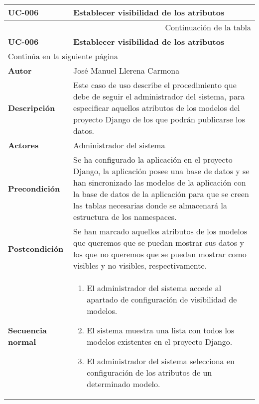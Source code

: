 \begin{center}
\begin{longtable}{||p{3.4cm}|p{12cm}||}
 \hline \hline \bf UC-006 &  \bf Establecer visibilidad de los atributos\\
\hline
\endfirsthead
\hline \multicolumn{2}{|r|}{{Continuación de la tabla}} \\ \hline
 \hline \bf UC-006 &  \bf Establecer visibilidad de los atributos \\
\hline
\endhead
\hline \multicolumn{2}{|l|}{{Continúa en la siguiente página}} \\ \hline
\endfoot
\endlastfoot
 \hline \bf Autor & José Manuel Llerena Carmona \\
 \hline \bf Descripción & Este caso de uso describe el procedimiento que debe
             de seguir el administrador del sistema, para especificar aquellos
             atributos de los modelos del proyecto Django de los que podrán
             publicarse los datos.\\
 \hline \bf Actores & Administrador del sistema\\
 \hline \bf Precondición & Se ha configurado la aplicación en el proyecto
             Django, la aplicación posee una base de datos y se han sincronizado
             las modelos de la aplicación con la base de datos de la aplicación
             para que se creen las tablas necesarias donde se almacenará la
             estructura de los namespaces.\\
 \hline \bf Postcondición & Se han marcado aquellos atributos de los modelos
             que queremos que se puedan mostrar sus datos y los que no queremos
             que se puedan mostrar como visibles y no visibles, respectivamente.\\
 \hline \bf Secuencia normal & 
             \begin{enumerate}
                \item El administrador del sistema accede al apartado de
                       configuración de visibilidad de modelos.
                \item El sistema muestra una lista con todos los modelos
                       existentes en el proyecto Django.
                \item El administrador del sistema selecciona en configuración
                       de los atributos de un determinado modelo.

\end{enumerate}
\end{longtable}
\end{center}
